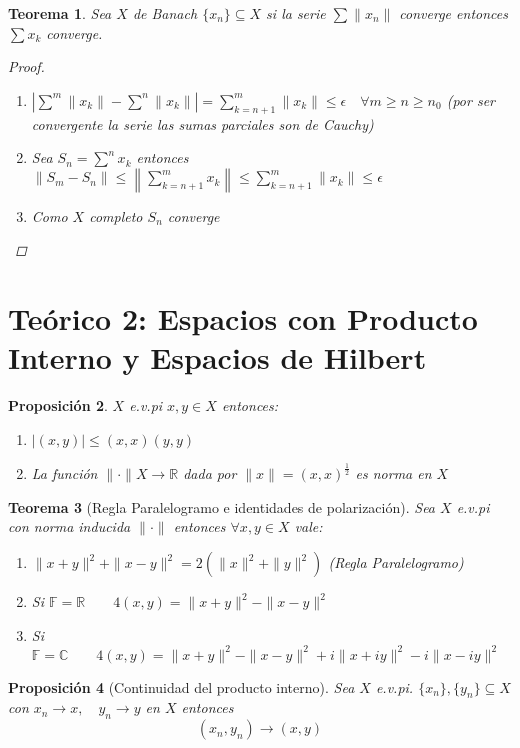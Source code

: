\documentclass[12pt,a4paper]{article}
\newtheorem{theorem}{Teorema}[section]
\newtheorem{proposition}[theorem]{Proposición}
\theoremstyle{definition}
\theoremstyle{remark}
\begin{document}
\begin{theorem}
Sea $X$ de Banach $\{x_n\} \subseteq X$ si la serie $\sum\|x_n\|$ converge entonces $\sum x_k$ converge.
\begin{proof}
\begin{enumerate}
    \item $\left|\sum^m \|x_k\| - \sum^n \|x_k\|\right| =\sum^m_{k=n+1} \|x_k\| \leq\epsilon \quad\forall m\geq n\geq n_0$ (por ser convergente la serie las sumas parciales son de Cauchy)
    \item Sea $S_n=\sum^n x_k$ entonces $\|S_m-S_n\|\leq \left\|\sum^m_{k=n+1}x_k\right\|\leq \sum^m_{k=n+1}\|x_k\|\leq\epsilon$
    \item Como $X$ completo $S_n$ converge
\end{enumerate}
\end{proof}
\end{theorem}

\section{Teórico 2: Espacios con Producto Interno y Espacios de Hilbert}

\begin{proposition}
$X$ e.v.pi $x,y\in X$ entonces:
\begin{enumerate}
    \item $|(x,y)|\leq(x,x)(y,y)$
    \item La función $\|\cdot\| X\rightarrow \mathbb{R}$ dada por $\|x\|=(x,x)^{\frac{1}{2}}$ es norma en $X$
\end{enumerate}
\end{proposition}

\begin{theorem}[Regla Paralelogramo e identidades de polarización]
Sea $X$ e.v.pi con norma inducida $\|\cdot\|$ entonces $\forall x,y\in X$ vale:
\begin{enumerate}
    \item $\|x+y\|^2 + \|x-y\|^2 = 2(\|x\|^2+\|y\|^2)$ (Regla Paralelogramo)
    \item Si $\mathbb{F}=\mathbb{R}\quad\quad 4(x,y)=\|x+y\|^2-\|x-y\|^2$
    \item Si $\mathbb{F}=\mathbb{C}\quad\quad 4(x,y)=\|x+y\|^2-\|x-y\|^2+i\|x+iy\|^2-i\|x-iy\|^2$
\end{enumerate}
\end{theorem}

\begin{proposition}[Continuidad del producto interno]
Sea $X$ e.v.pi. $\{x_n\},\{y_n\}\subseteq X$ con $x_n\rightarrow x,\quad y_n\rightarrow y$ en $X$ entonces
$$(x_n,y_n)\rightarrow(x,y)$$
\end{proposition}
\end{document}
